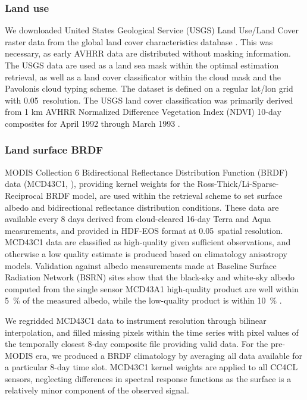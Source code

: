 \subsubsection{Land use}\label{sec:USGS}

We downloaded United States Geological Service (USGS) Land Use/Land Cover raster data from the global land cover characteristics database \citep{USGS}. This was necessary, as early AVHRR data are distributed without masking information. The USGS data are used as a land sea mask within the optimal estimation retrieval, as well as a land cover classificator within the cloud mask and the Pavolonis cloud typing scheme. The dataset is defined on a regular lat/lon grid with 0.05\textdegree\ resolution. The USGS land cover classification was primarily derived from 1 km AVHRR Normalized Difference Vegetation Index (NDVI) 10-day composites for April 1992 through March 1993 \citep{USGS}. 

\subsubsection{Land surface BRDF}\label{sec:BRDF}

MODIS Collection 6 Bidirectional Reflectance Distribution Function
 (BRDF) data (MCD43C1, \citet{MODIS_BRDF}), providing kernel weights for the Ross-Thick/Li-Sparse-Reciprocal BRDF model, are used within the retrieval scheme to set surface albedo and bidirectional reflectance distribution conditions. These data are available every 8 days derived from cloud-cleared 16-day Terra and Aqua measurements, and provided in HDF-EOS format at 0.05\textdegree\ spatial resolution. MCD43C1 data are classified as high-quality given sufficient observations, and otherwise a low quality estimate is produced based on climatology anisotropy models. Validation against albedo measurements made at Baseline Surface Radiation Network (BSRN) sites show that the black-sky and white-sky albedo computed from the single sensor MCD43A1 high-quality product are well within 5~\% of the measured albedo, while the low-quality product is within 10~\% \citep{Lucht98}.

We regridded MCD43C1 data to instrument resolution through bilinear interpolation, and filled missing pixels within the time series with pixel values of the temporally closest 8-day composite file providing valid data. For the pre-MODIS era, we produced a BRDF climatology by averaging all data available for a particular 8-day time slot. MCD43C1 kernel weights are applied to all CC4CL sensors, neglecting differences in spectral response functions as the surface is a relatively minor component of the observed signal. 

